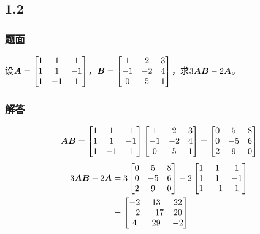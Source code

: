 \documentclass{beamer}
\begin{document}
\subsection*{1.2}

\begin{frame}
\frametitle{题面}

设\(\boldsymbol{A}=\begin{bmatrix}
    1 & 1  & 1  \\
    1 & 1  & -1 \\
    1 & -1 & 1
\end{bmatrix}\)，\(\boldsymbol{B}=\begin{bmatrix}
    1  & 2  & 3 \\
    -1 & -2 & 4 \\
    0  & 5  & 1
\end{bmatrix}\)，求\(3\boldsymbol{A}\boldsymbol{B}-2\boldsymbol{A}\)。

\end{frame}

\begin{frame}
\frametitle{解答}
    \begin{equation*}
        \boldsymbol{A}\boldsymbol{B}           =
        \begin{bmatrix}
            1 & 1  & 1  \\
            1 & 1  & -1 \\
            1 & -1 & 1
        \end{bmatrix}
        \begin{bmatrix}
            1  & 2  & 3 \\
            -1 & -2 & 4 \\
            0  & 5  & 1
        \end{bmatrix}=
        \begin{bmatrix}
            0 & 5  & 8 \\
            0 & -5 & 6 \\
            2 & 9  & 0
        \end{bmatrix}
    \end{equation*}
    \pause
    \begin{align*}
        3\boldsymbol{A}\boldsymbol{B}-2 \boldsymbol{A} & =3
        \begin{bmatrix}
            0 & 5  & 8 \\
            0 & -5 & 6 \\
            2 & 9  & 0
        \end{bmatrix}-2
        \begin{bmatrix}
            1 & 1  & 1  \\
            1 & 1  & -1 \\
            1 & -1 & 1
        \end{bmatrix} \\&=
        \begin{bmatrix}
            -2 & 13  & 22 \\
            -2 & -17 & 20 \\
            4  & 29  & -2
        \end{bmatrix}
    \end{align*}

\end{frame}
\end{document}
